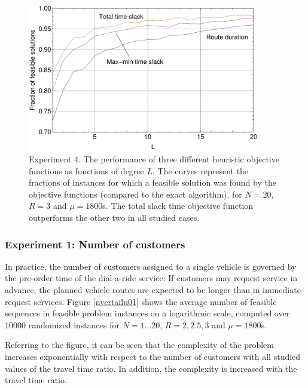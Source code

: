 \documentclass[dissertation,draft*]{aaltoseries}
\begin{document}
\begin{figure}[ht]
\begin{center}
\includegraphics[width=0.9\textwidth]{objvertailu01.pdf}
\caption{Experiment 4. The performance of three different heuristic objective functions as functions of degree $L$.
The curves represent the fractions of instances for which a feasible solution was found by the objective functions 
(compared to the exact algorithm), 
for $N=20$, $R=3$ and $\mu=1800$s. The total slack time objective function
outperforms the other two in all studied cases.
}
\label{objvertailu01}
\end{center}
\end{figure}




\subsubsection{Experiment 1: Number of customers}
In practice, the number of customers assigned to a single vehicle is governed by the
pre-order time of the dial-a-ride service: If customers may request service in
advance, the planned vehicle routes are expected to be longer than in immediate-request
services. Figure \ref{nvertailu01} shows the average number of feasible sequences in feasible problem instances 
on a logarithmic scale, computed over 10000
randomized instances for $N=1\ldots 20$, $R = 2,2.5,3$ and $\mu = 1800$s.

Referring to the figure, it can be seen that the complexity of the problem increases exponentially
with respect to the number of customers with all studied values of the travel time ratio.  
In addition, the complexity is increased with the travel time ratio. 
\end{document}
